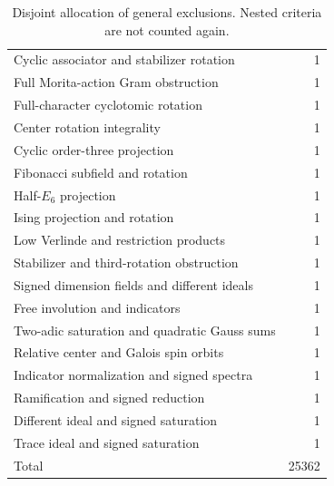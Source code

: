 \begin{table}[ht]
\begin{tabular}{lr}
Cyclic associator and stabilizer rotation & 1\\
Full Morita-action Gram obstruction & 1\\
Full-character cyclotomic rotation & 1\\
Center rotation integrality & 1\\
Cyclic order-three projection & 1\\
Fibonacci subfield and rotation & 1\\
Half-$E_6$ projection & 1\\
Ising projection and rotation & 1\\
Low Verlinde and restriction products & 1\\
Stabilizer and third-rotation obstruction & 1\\
Signed dimension fields and different ideals & 1\\
Free involution and indicators & 1\\
Two-adic saturation and quadratic Gauss sums & 1\\
Relative center and Galois spin orbits & 1\\
Indicator normalization and signed spectra & 1\\
Ramification and signed reduction & 1\\
Different ideal and signed saturation & 1\\
Trace ideal and signed saturation & 1\\
\midrule
Total & 25362\\
\bottomrule\end{tabular}
\caption{Disjoint allocation of general exclusions. Nested criteria are not counted again.}\label{tab:allocation}
\end{table}
